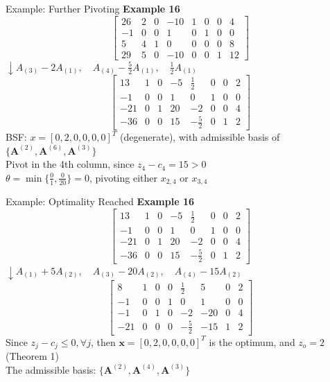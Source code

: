 \documentclass[aspectratio=169,hyperref,UTF8,CJK]{beamer}
\begin{document}
\begin{frame}{Example: Further Pivoting}
\textbf{Example 16}
\[
\begin{bmatrix}
26 & 2 & 0 & -10 & 1 & 0 & 0 & 4 \\
-1 & 0 & 0 & 1 & 0 & 1 & 0 & 0 \\
5 & 4 & 1 & 0 & 0 & 0 & 0 & 8 \\
29 & 5 & 0 & -10 & 0 & 0 & 1 & 12
\end{bmatrix}
\]
\(\downarrow A_{(3)} - 2A_{(1)}, \quad A_{(4)} - \frac{5}{2}A_{(1)}, \quad \frac{1}{2}A_{(1)}\)
\[
\begin{bmatrix}
13 & 1 & 0 & -5 & \frac{1}{2} & 0 & 0 & 2 \\
-1 & 0 & 0 & 1 & 0 & 1 & 0 & 0 \\
-21 & 0 & 1 & 20 & -2 & 0 & 0 & 4 \\
-36 & 0 & 0 & 15 & -\frac{5}{2} & 0 & 1 & 2
\end{bmatrix}
\]
BSF: \(x = [0, 2, 0, 0, 0, 0]^T\) (degenerate), with admissible basis of \(\{\mathbf{A}^{(2)}, \mathbf{A}^{(6)}, \mathbf{A}^{(3)}\}\) \\
Pivot in the 4th column, since \(z_4 - c_4 = 15 > 0\) \\
\(\theta = \min\{\frac{0}{1}, \frac{0}{20}\} = 0\), pivoting either \(x_{2,4}\) or \(x_{3,4}\)
\end{frame}

\begin{frame}{Example: Optimality Reached}
\textbf{Example 16}
\[
\begin{bmatrix}
13 & 1 & 0 & -5 & \frac{1}{2} & 0 & 0 & 2 \\
-1 & 0 & 0 & 1 & 0 & 1 & 0 & 0 \\
-21 & 0 & 1 & 20 & -2 & 0 & 0 & 4 \\
-36 & 0 & 0 & 15 & -\frac{5}{2} & 0 & 1 & 2
\end{bmatrix}
\]
\(\downarrow A_{(1)} + 5A_{(2)}, \quad A_{(3)} - 20A_{(2)}, \quad A_{(4)} - 15A_{(2)}\)
\[
\begin{bmatrix}
8 & 1 & 0 & 0 & \frac{1}{2} & 5 & 0 & 2 \\
-1 & 0 & 0 & 1 & 0 & 1 & 0 & 0 \\
-1 & 0 & 1 & 0 & -2 & -20 & 0 & 4 \\
-21 & 0 & 0 & 0 & -\frac{5}{2} & -15 & 1 & 2
\end{bmatrix}
\]
Since \(z_j - c_j \le 0, \forall j\), then \(\mathbf{x} = [0, 2, 0, 0, 0, 0]^T\) is the optimum, and \(z_o = 2\) (Theorem 1) \\
The admissible basis: \(\{\mathbf{A}^{(2)}, \mathbf{A}^{(4)}, \mathbf{A}^{(3)}\}\)
\end{frame}
\end{document}
